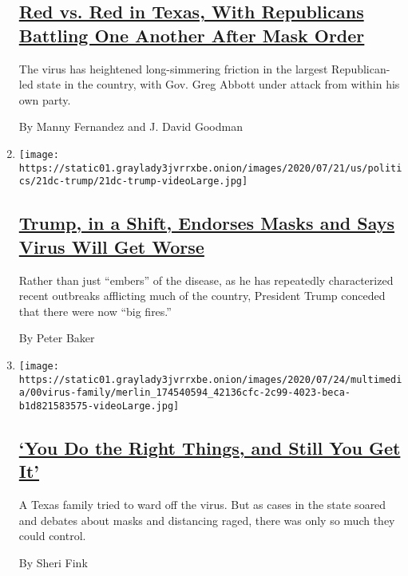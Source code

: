 \begin{enumerate}
  \hypertarget{red-vs-red-in-texas-with-republicans-battling-one-another-after-mask-order}{%
  \subsection{\texorpdfstring{\href{/2020/07/23/us/coronavirus-texas-abbott-republicans.html}{Red
  vs. Red in Texas, With Republicans Battling One Another After Mask
  Order}}{Red vs. Red in Texas, With Republicans Battling One Another After Mask Order}}\label{red-vs-red-in-texas-with-republicans-battling-one-another-after-mask-order}}

  The virus has heightened long-simmering friction in the largest
  Republican-led state in the country, with Gov. Greg Abbott under
  attack from within his own party.

  By Manny Fernandez and J. David Goodman
\item
  \texttt{[image: https://static01.graylady3jvrrxbe.onion/images/2020/07/21/us/politics/21dc-trump/21dc-trump-videoLarge.jpg]}

  \hypertarget{trump-in-a-shift-endorses-masks-and-says-virus-will-get-worse}{%
  \subsection{\texorpdfstring{\href{/2020/07/21/us/politics/trump-coronavirus-masks.html}{Trump,
  in a Shift, Endorses Masks and Says Virus Will Get
  Worse}}{Trump, in a Shift, Endorses Masks and Says Virus Will Get Worse}}\label{trump-in-a-shift-endorses-masks-and-says-virus-will-get-worse}}

  Rather than just ``embers'' of the disease, as he has repeatedly
  characterized recent outbreaks afflicting much of the country,
  President Trump conceded that there were now ``big fires.''

  By Peter Baker
\item
  \texttt{[image: https://static01.graylady3jvrrxbe.onion/images/2020/07/24/multimedia/00virus-family/merlin\_174540594\_42136cfc-2c99-4023-beca-b1d821583575-videoLarge.jpg]}

  \hypertarget{you-do-the-right-things-and-still-you-get-it}{%
  \subsection{\texorpdfstring{\href{/2020/07/26/us/coronavirus-family-houston-masks.html}{`You
  Do the Right Things, and Still You Get
  It'}}{`You Do the Right Things, and Still You Get It'}}\label{you-do-the-right-things-and-still-you-get-it}}

  A Texas family tried to ward off the virus. But as cases in the state
  soared and debates about masks and distancing raged, there was only so
  much they could control.

  By Sheri Fink
\end{enumerate}

